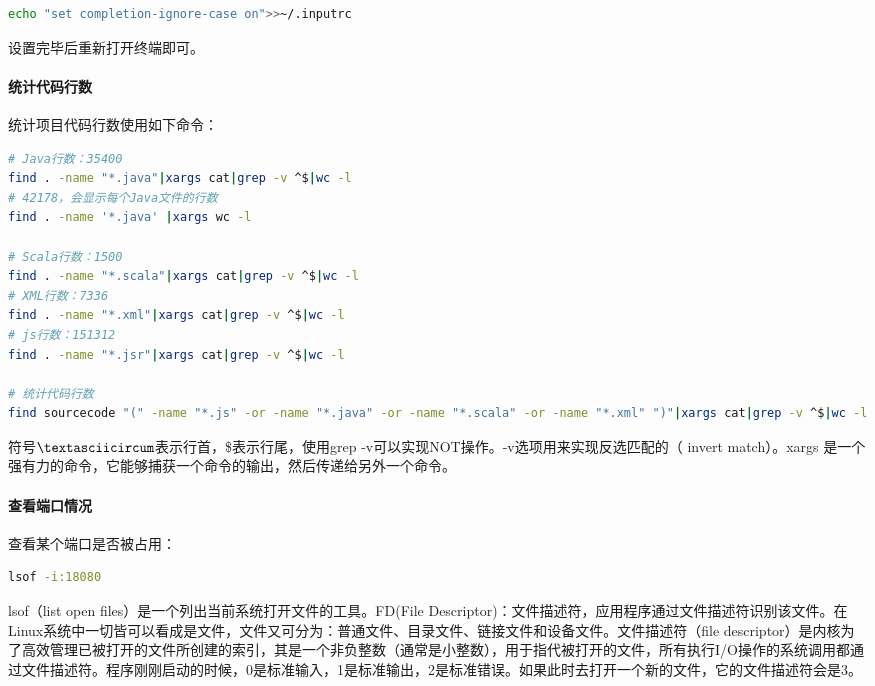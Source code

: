 \documentclass[letter]{book}
\begin{document}
\begin{lstlisting}[language=Bash]
echo "set completion-ignore-case on">>~/.inputrc
\end{lstlisting}

设置完毕后重新打开终端即可。

\paragraph{统计代码行数}

统计项目代码行数使用如下命令：

\begin{lstlisting}[language=Bash]
# Java行数：35400
find . -name "*.java"|xargs cat|grep -v ^$|wc -l
# 42178，会显示每个Java文件的行数
find . -name '*.java' |xargs wc -l

# Scala行数：1500
find . -name "*.scala"|xargs cat|grep -v ^$|wc -l
# XML行数：7336
find . -name "*.xml"|xargs cat|grep -v ^$|wc -l
# js行数：151312
find . -name "*.jsr"|xargs cat|grep -v ^$|wc -l

# 统计代码行数
find sourcecode "(" -name "*.js" -or -name "*.java" -or -name "*.scala" -or -name "*.xml" ")"|xargs cat|grep -v ^$|wc -l
\end{lstlisting}

符号$\textasciicircum$表示行首，\$表示行尾，使用grep -v可以实现NOT操作。-v选项用来实现反选匹配的（ invert match）。xargs 是一个强有力的命令，它能够捕获一个命令的输出，然后传递给另外一个命令。

\paragraph{查看端口情况}

查看某个端口是否被占用：

\begin{lstlisting}[language=Bash]
lsof -i:18080
\end{lstlisting}

lsof（list open files）是一个列出当前系统打开文件的工具。FD(File Descriptor)：文件描述符，应用程序通过文件描述符识别该文件。在Linux系统中一切皆可以看成是文件，文件又可分为：普通文件、目录文件、链接文件和设备文件。文件描述符（file descriptor）是内核为了高效管理已被打开的文件所创建的索引，其是一个非负整数（通常是小整数），用于指代被打开的文件，所有执行I/O操作的系统调用都通过文件描述符。程序刚刚启动的时候，0是标准输入，1是标准输出，2是标准错误。如果此时去打开一个新的文件，它的文件描述符会是3。
\end{document}
